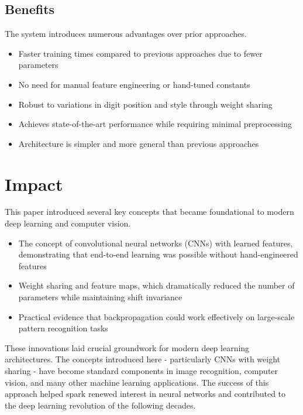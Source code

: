 \documentclass[10pt]{article}
\begin{document}

\subsection*{Benefits}


The system introduces numerous advantages over prior approaches.

\begin{itemize}
    \item Faster training times compared to previous approaches due to fewer parameters
    \item No need for manual feature engineering or hand-tuned constants
    \item Robust to variations in digit position and style through weight sharing
    \item Achieves state-of-the-art performance while requiring minimal preprocessing
    \item Architecture is simpler and more general than previous approaches
\end{itemize}

\section*{Impact}
This paper introduced several key concepts that became foundational to modern deep learning and computer vision.

\begin{itemize}
    \item The concept of convolutional neural networks (CNNs) with learned features, demonstrating that end-to-end learning was possible without hand-engineered features
    \item Weight sharing and feature maps, which dramatically reduced the number of parameters while maintaining shift invariance
    \item Practical evidence that backpropagation could work effectively on large-scale pattern recognition tasks
\end{itemize}

These innovations laid crucial groundwork for modern deep learning architectures. The concepts introduced here - particularly CNNs with weight sharing - have become standard components in image recognition, computer vision, and many other machine learning applications. The success of this approach helped spark renewed interest in neural networks and contributed to the deep learning revolution of the following decades.




\end{document}
